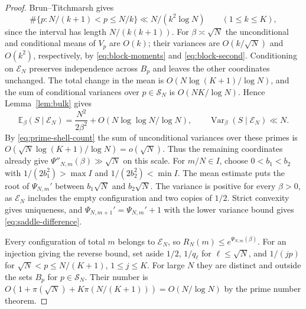 \documentclass[11pt]{amsart}
\theoremstyle{remark}
\DeclareMathOperator{\Var}{Var}
\newcommand{\Ee}{\mathbb E}
\begin{document}
\begin{proof}
Brun--Titchmarsh \cite[(1.12)]{montgomery-vaughan-sieve} gives
\begin{equation}\label{eq:prime-shell-count}
 \#\{p:N/(k+1)<p\le N/k\}\ll N/(k^2\log N)\qquad(1\le k\le K),
\end{equation}
since the interval has length \(N/(k(k+1))\). For \(\beta\asymp\sqrt N\)
the unconditional and conditional means of \(V_p\) are \(O(k)\);
their variances are \(O(k/\sqrt N)\) and \(O(k^2)\), respectively,
by \eqref{eq:block-moments} and \eqref{eq:block-second}.
Conditioning on \(\mathcal E_N\) preserves independence across \(B_p\)
and leaves the other coordinates unchanged. The total change in
the mean is \(O(N\log(K+1)/\log N)\), and the sum of conditional
variances over \(p\in\mathcal S_N\) is \(O(NK/\log N)\).
Hence Lemma~\ref{lem:bulk} gives
\begin{equation}\label{eq:conditioned-moments}
 \Ee_\beta(S\mid\mathcal E_N)=\frac{N^2}{2\beta^2}
      +O(N\log\log N/\log N),\qquad
 \Var_\beta(S\mid\mathcal E_N)\ll N.
\end{equation}
By \eqref{eq:prime-shell-count} the sum of unconditional variances
over these primes is \(O(\sqrt N\log(K+1)/\log N)=o(\sqrt N)\).
Thus the remaining coordinates already give
\(\Psi''_{N,m}(\beta)\gg\sqrt N\) on this scale.
For \(m/N\in I\), choose \(0<b_1<b_2\) with
\(1/(2b_1^2)>\max I\) and \(1/(2b_2^2)<\min I\).
The mean estimate puts the root of \(\Psi_{N,m}'\) between
\(b_1\sqrt N\) and \(b_2\sqrt N\). The variance is positive for every
\(\beta>0\), as \(\mathcal E_N\) includes the empty configuration and
two copies of \(1/2\). Strict convexity gives uniqueness, and
\(\Psi_{N,m+1}'=\Psi_{N,m}'+1\) with the lower variance bound gives
\eqref{eq:saddle-difference}.

Every configuration of total \(m\) belongs to \(\mathcal E_N\), so
\(R_N(m)\le e^{\Psi_{N,m}(\beta)}\).
For an injection giving the reverse bound, set aside \(1/2\),
\(1/q_\ell\) for \(\ell\le\sqrt N\), and \(1/(jp)\) for
\(\sqrt N<p\le N/(K+1)\), \(1\le j\le K\).
For large \(N\) they are distinct and outside the sets \(B_p\) for
\(p\in\mathcal S_N\). Their number is
\(O(1+\pi(\sqrt N)+K\pi(N/(K+1)))=O(N/\log N)\) by the prime number theorem.


\end{proof}
\end{document}
